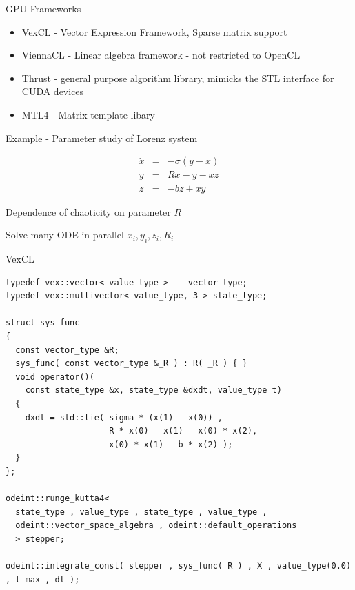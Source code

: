 \documentclass{beamer}
\newcommand{\heading}[1]{\centerline{\Large #1} \vspace{0.5em}}
\begin{document}
\begin{frame}[fragile]
 \heading{GPU Frameworks}

\begin{itemize}
 \item VexCL - Vector Expression Framework, Sparse matrix support
 \item ViennaCL - Linear algebra framework - not restricted to OpenCL
 \item Thrust - general purpose algorithm library, mimicks the STL interface for CUDA devices
 \item MTL4 - Matrix template libary
\end{itemize}

\end{frame}



\begin{frame}[fragile]
 \heading{Example - Parameter study of Lorenz system}

\begin{eqnarray*}
\dot{x} & = & - \sigma ( y - x ) \\
\dot{y} & = & R x - y - x z \\
\dot{z} & = & - b z + x y
\end{eqnarray*}

Dependence of chaoticity on parameter $R$

\vspace{2ex}

Solve many ODE in parallel $x_i,y_i,z_i,R_i$

\end{frame}


\begin{frame}[fragile]
 \heading{VexCL}

\begin{lstlisting}[basicstyle=\scriptsize\ttfamily]
typedef vex::vector< value_type >    vector_type;
typedef vex::multivector< value_type, 3 > state_type;

struct sys_func
{
  const vector_type &R;
  sys_func( const vector_type &_R ) : R( _R ) { }
  void operator()(
    const state_type &x, state_type &dxdt, value_type t)
  {
    dxdt = std::tie( sigma * (x(1) - x(0)) ,
                     R * x(0) - x(1) - x(0) * x(2),
                     x(0) * x(1) - b * x(2) );
  }
};

odeint::runge_kutta4<
  state_type , value_type , state_type , value_type ,
  odeint::vector_space_algebra , odeint::default_operations
  > stepper;

odeint::integrate_const( stepper , sys_func( R ) , X , value_type(0.0) , t_max , dt );

\end{lstlisting}

\end{frame}
\end{document}
